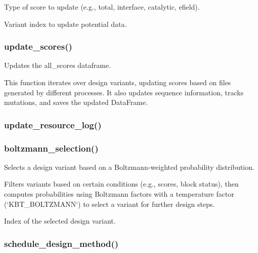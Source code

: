 \documentclass[10pt]{extarticle}
\begin{document}
\par\vspace*{0.5\baselineskip}
{
\begin{description}[noitemsep,topsep=0pt,parsep=0pt,labelwidth=5cm,leftmargin=!,labelindent=0pt,labelsep=0.2cm,itemsep=0pt]
\item[\textcolor{mpgAccentBlue!75!white}{score\_type (str)\dotfill}] Type of score to update (e.g., total, interface, catalytic, efield).
\item[\textcolor{mpgAccentBlue!75!white}{index (int)\dotfill}] Variant index to update potential data.
\end{description}
}
\subsubsection{update\_scores()}
Updates the all\_scores dataframe.

This function iterates over design variants, updating scores based on files generated by different processes.
It also updates sequence information, tracks mutations, and saves the updated DataFrame.
\subsubsection{update\_resource\_log()}
\subsubsection{boltzmann\_selection()}
Selects a design variant based on a Boltzmann-weighted probability distribution.

Filters variants based on certain conditions (e.g., scores, block status), then computes probabilities
using Boltzmann factors with a temperature factor (`KBT\_BOLTZMANN`) to select a variant for further design steps.

\par\vspace*{0.5\baselineskip}
{
\begin{description}[noitemsep,topsep=0pt,parsep=0pt,labelwidth=5cm,leftmargin=!,labelindent=0pt,labelsep=0.2cm,itemsep=0pt]
\item[\textcolor{mpgAccentBlue!75!white}{int\dotfill}] Index of the selected design variant.
\end{description}
}
\subsubsection{schedule\_design\_method()}
\end{document}
